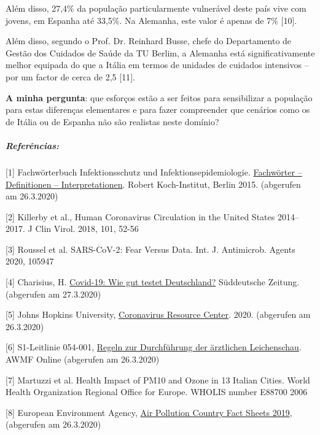 Além disso, 27,4\% da população particularmente vulnerável deste país
vive com jovens, em Espanha até 33,5\%. Na Alemanha, este valor é apenas
de 7\% {[}10{]}.

Além disso, segundo o Prof. Dr. Reinhard Busse, chefe do Departamento de
Gestão dos Cuidados de Saúde da TU Berlim, a Alemanha está
significativamente melhor equipada do que a Itália em termos de unidades
de cuidados intensivos -- por um factor de cerca de 2,5 {[}11{]}.

\textbf{A minha pergunta}: que esforços estão a ser feitos para
sensibilizar a população para estas diferenças elementares e para fazer
compreender que cenários como os de Itália ou de Espanha não são
realistas neste domínio?

\hypertarget{referuxeancias}{%
\subparagraph{\texorpdfstring{\textbf{Referências}:}{Referências:}}\label{referuxeancias}}

{[}1{]} Fachwörterbuch Infektionsschutz und Infektionsepidemiologie.
\href{https://www.rki.de/DE/Content/Service/Publikationen/Fachwoerterbuch_Infektionsschutz.html}{Fachwörter
-- Definitionen -- Interpretationen}. Robert Koch-Institut, Berlin 2015.
(abgerufen am 26.3.2020)

{[}2{]} Killerby et al., Human Coronavirus Circulation in the United
States 2014--2017. J Clin Virol. 2018, 101, 52-56

{[}3{]} Roussel et al. SARS-CoV-2: Fear Versus Data. Int. J. Antimicrob.
Agents 2020, 105947

{[}4{]} Charisius, H.
\href{https://www.sueddeutsche.de/gesundheit/covid-19-coronavirus-testverfahren-1.4855487}{Covid-19:
Wie gut testet Deutschland?} Süddeutsche Zeitung. (abgerufen am
27.3.2020)

{[}5{]} Johns Hopkins University,
\href{https://coronavirus.jhu.edu/map.html}{Coronavirus Resource
Center}. 2020. (abgerufen am 26.3.2020)

{[}6{]} S1-Leitlinie 054-001,
\href{https://www.awmf.org/uploads/tx_szleitlinien/054-002l_S1_Regeln-zur-Durchfuehrung-der-aerztlichen-Leichenschau_2018-02_01.pdf}{Regeln
zur Durchführung der ärztlichen Leichenschau}. AWMF Online (abgerufen am
26.3.2020)

{[}7{]} Martuzzi et al. Health Impact of PM10 and Ozone in 13 Italian
Cities. World Health Organization Regional Office for Europe. WHOLIS
number E88700 2006

{[}8{]} European Environment Agency,
\href{https://www.eea.europa.eu/themes/air/country-fact-sheets/2019-country-fact-sheets}{Air
Pollution Country Fact Sheets 2019}, (abgerufen am 26.3.2020)

